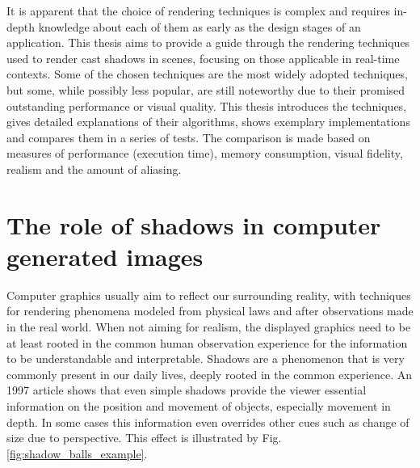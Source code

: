 It is apparent that the choice of rendering techniques is complex and requires in-depth knowledge about each of them as early as the design stages of an application. This thesis aims to provide a guide through the rendering techniques used to render cast shadows in scenes, focusing on those applicable in real-time contexts. Some of the chosen techniques are the most widely adopted techniques, but some, while possibly less popular, are  still noteworthy due to their promised outstanding performance or visual quality. This thesis introduces the techniques, gives detailed explanations of their algorithms, shows exemplary implementations and compares them in a series of tests. The comparison is made based on measures of performance (execution time), memory consumption, visual fidelity, realism and the amount of aliasing. %


\section{The role of shadows in computer generated images}

Computer graphics usually aim to reflect our surrounding reality, with techniques for rendering phenomena modeled from physical laws and after observations made in the real world. When not aiming for realism, the displayed graphics need to be at least rooted in the common human observation experience for the information to be understandable and interpretable. Shadows are a phenomenon that is very commonly present in our daily lives, deeply rooted in the common experience. An 1997 article \cite{bib:article:depth_shadows} shows that even simple shadows provide the viewer essential information on the position and movement of objects, especially movement in depth. In some cases this information even overrides other cues such as change of size due to perspective. This effect is illustrated by Fig. \ref{fig:shadow_balls_example}.

